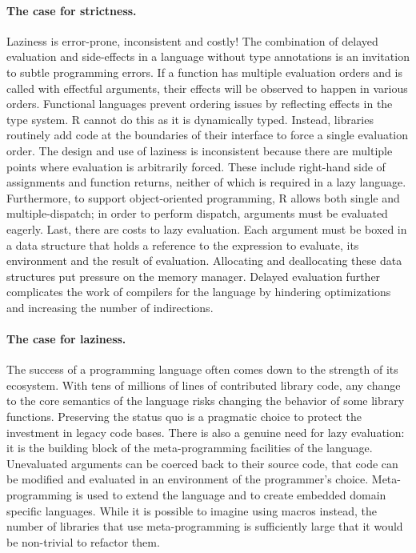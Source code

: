 \documentclass[review,nonacm,screen,acmsmall,anonymous=true]{acmart}
\newcommand{\authorcomment}[3]{}
\newcommand{\SK}[1]{\authorcomment{yellow}{SK}{#1}}
\begin{document}
\paragraph{The case for strictness.} Laziness is error-prone, inconsistent
and costly! \SK{previous sentence sounds a bit of an overstatement until next sentence clarifies that
we mean that in the presence of side-effects and no type-annotations .otoh maybe that's the point...} 
The combination of delayed evaluation and side-effects in a language
without type annotations is an invitation to subtle programming errors. If a
function has multiple evaluation orders and is called with effectful arguments,
their effects will be observed to happen in various orders. Functional languages
prevent ordering issues by reflecting effects in the type system. R cannot do
this as it is dynamically typed. Instead, libraries routinely add code at the
boundaries of their interface to force a single evaluation order. The design and
use of laziness is inconsistent because there are multiple points where
evaluation is arbitrarily forced. These include right-hand side of assignments
and function returns, neither of which is required in a lazy language.
Furthermore, to support object-oriented programming, R allows both single and
multiple-dispatch; in order to perform dispatch, arguments must be evaluated
eagerly. Last, there are costs to lazy evaluation. Each argument must be boxed
in a data structure that holds a reference to the expression to evaluate, its
environment and the result of evaluation. Allocating and deallocating these data
structures put pressure on the memory manager. Delayed evaluation further
complicates the work of compilers for the language by hindering optimizations
and increasing the number of indirections.

\paragraph{The case for laziness.} The success of a programming language
often comes down to the strength of its ecosystem. With tens of millions of
lines of contributed library code, any change to the core semantics of the
language risks changing the behavior of some library functions. Preserving the
status quo is a pragmatic choice to protect the investment in legacy code bases.
There is also a genuine need for lazy evaluation: it is the building block of
the meta-programming facilities of the language. Unevaluated arguments can be
coerced back to their source code, that code can be modified and evaluated in
an environment of the programmer's choice. Meta-programming is used to extend
the language and to create embedded domain specific languages. While it is
possible to imagine using macros instead, the number of libraries that use
meta-programming is sufficiently large that it would be non-trivial to refactor
them.
\end{document}
